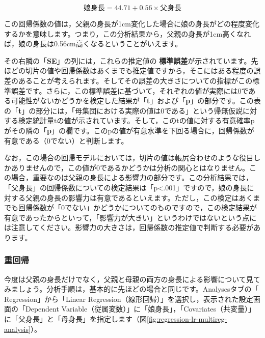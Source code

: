\documentclass[
  12pt,
  a5jpaper,
  lualatex, ja=standard]{bxjsbook}
\renewcommand{\emph}[1]{\textbf{\color{emph} #1}}
\newcommand{\infig}[1]{\raisebox{-.2\zh}{\texttt{[image: images/assets/\#1]}}}
\begin{document}
\[
\text{娘身長}= 44.71 + 0.56 \times \text{父身長}
\]

この回帰係数の値は，父親の身長が1cm変化した場合に娘の身長がどの程度変化するかを意味します。つまり，この分析結果から，父親の身長が1cm高くなれば，娘の身長は0.56cm高くなるということがいえます。

その右隣の「\textbf{SE}」の列には，これらの推定値の\emph{標準誤差}が示されています。先ほどの切片の値や回帰係数はあくまでも推定値ですから，そこにはある程度の誤差のあることが考えられます。そしてその誤差の大きさについての指標がこの標準誤差です。さらに，この標準誤差に基づいて，それぞれの値が実際には0である可能性がないかどうかを検定した結果が「\textbf{t}」および「\textbf{p}」の部分です。この表の「\textbf{t}」の部分には，「母集団における実際の値は0である」という帰無仮説に対する検定統計量tの値が示されています。そして，このtの値に対する有意確率pがその隣の「\textbf{p}」の欄です。このpの値が有意水準を下回る場合に，回帰係数が有意である（0でない）と判断します。

なお，この場合の回帰モデルにおいては，切片の値は帳尻合わせのような役目しかありませんので，この値が0であるかどうかは分析の関心とはなりません。この場合，重要なのは父親の身長による影響力の部分です。この分析結果では，「父身長」の回帰係数についての検定結果は「p\textless.001」ですので，娘の身長に対する父親の身長の影響力は有意であるといえます。ただし，この検定はあくまでも回帰係数が「0でない」かどうかについてのものですので，この検定結果が有意であったからといって，「影響力が大きい」というわけではないという点には注意してください。影響力の大きさは，回帰係数の推定値で判断する必要があります。

\hypertarget{lr-multi}{%
\subsubsection*{重回帰}\label{lr-multi}}

今度は父親の身長だけでなく，父親と母親の両方の身長による影響について見てみましょう。分析手順は，基本的に先ほどの場合と同じです。Analysesタブの「\infig{analysis-regression.pdf} Regression」から「Linear Regression（線形回帰）」を選択し，表示された設定画面の「Dependent Variable（従属変数）」に「娘身長」，「Covariates（共変量）」に「父身長」と「母身長」を指定します（図\ref{fig:regression-lr-multireg-analysis}）。
\end{document}
